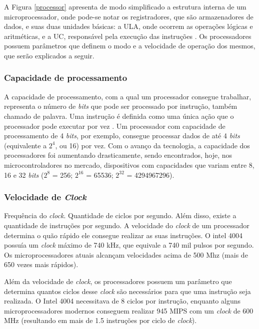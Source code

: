 
A Figura \ref{processor} apresenta de modo simplificado a estrutura interna de um microprocessador, onde pode-se notar os registradores, que são armazenadores de dados, e suas duas unidades básicas: a \ac{ULA}, onde ocorrem as operações lógicas e aritméticas, e a \ac{UC}, responsável pela execução das instruções \cite{book5}.
Os processadores possuem parâmetros que definem o modo e a velocidade de operação dos mesmos, que serão explicados a seguir.

\subsubsection{Capacidade de processamento}

A capacidade de processamento, com a qual um processador consegue trabalhar, representa o número de \textit{bits} que pode ser processado por instrução, também chamado de palavra. Uma instrução é definida como uma única ação que o processador pode executar por vez \cite{book4}. 
Um processador com capacidade de processamento de 4 \textit{bits}, por exemplo, consegue processar dados de até 4 \textit{bits} (equivalente a \(2^4\), ou 16) por vez. Com o avanço da tecnologia, a capacidade dos processadores foi aumentando drasticamente, sendo encontrados, hoje, nos microcontroladores no mercado, dispositivos com capacidades que variam entre 8, 16 e 32 \textit{bits} (\(2^8\) = 256; \(2^{16}\) = 65536; \(2^{32}\) = 4294967296).

\subsubsection{Velocidade de \textit{Clock}}

Frequência do \textit{clock}. Quantidade de ciclos por segundo. Além disso, existe a quantidade de instruções por segundo. A velocidade do \textit{clock} de um processador determina o quão rápido ele consegue realizar as suas instruções. O intel 4004 possuía um \textit{clock} máximo de 740 kHz, que equivale a 740 mil pulsos por segundo. Os microprocessadores atuais alcançam velocidades acima de 500 Mhz (mais de 650 vezes mais rápidos). 

Além da velocidade de \textit{clock}, os processadores possuem um parâmetro que determina quantos ciclos desse \textit{clock} são necessários para que uma instrução seja realizada. O Intel 4004 necessitava de 8 ciclos por instrução, enquanto alguns microprocessadores modernos conseguem realizar 945 \ac{MIPS} com um \textit{clock} de 600 MHz (resultando em mais de 1.5 instruções por ciclo de \textit{clock})\cite{clock}. %

